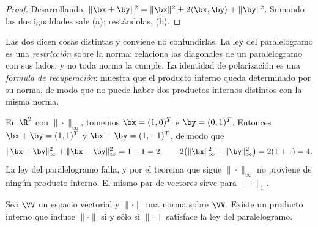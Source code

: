 \begin{proof}
Desarrollando, $\|\bx\pm\by\|^2=\|\bx\|^2\pm2\langle\bx,\by\rangle+\|\by\|^2$.
Sumando las dos igualdades sale (a); restándolas, (b).
\end{proof}

Las dos dicen cosas distintas y conviene no confundirlas. La ley del
paralelogramo es una \emph{restricción} sobre la norma: relaciona las
diagonales de un paralelogramo con sus lados, y no toda norma la cumple. La
identidad de polarización es una \emph{fórmula de recuperación}: muestra que
el producto interno queda determinado por su norma, de modo que no puede
haber dos productos internos distintos con la misma norma.

\begin{example}\label{ej:infinito-no}
En $\R^2$ con $\|\cdot\|_\infty$, tomemos $\bx=(1,0)^T$ e $\by=(0,1)^T$.
Entonces $\bx+\by=(1,1)^T$ y $\bx-\by=(1,-1)^T$, de modo que
\[
\|\bx+\by\|_\infty^2+\|\bx-\by\|_\infty^2=1+1=2,
\qquad
2\big(\|\bx\|_\infty^2+\|\by\|_\infty^2\big)=2(1+1)=4 .
\]
La ley del paralelogramo falla, y por el teorema que sigue $\|\cdot\|_\infty$
no proviene de ningún producto interno. El mismo par de vectores sirve para
$\|\cdot\|_1$.
\end{example}

\begin{thm}\label{teo-normaPI-carac}
Sea $\VV$ un espacio vectorial y $\|\cdot\|$ una norma sobre $\VV$. Existe un
producto interno que induce $\|\cdot\|$ si y sólo si $\|\cdot\|$ satisface la
ley del paralelogramo.
\end{thm}


